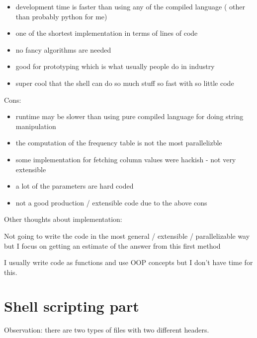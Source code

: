 \documentclass[letterpaper,10pt,english]{/usr/local/lib/python2.7/dist-packages/sphinx/texinputs/sphinxhowto}
\begin{document}
\begin{itemize}
\itemsep1pt\parskip0pt
\item
  development time is faster than using any of the compiled language (
  other than probably python for me)
\item
  one of the shortest implementation in terms of lines of code
\item
  no fancy algorithms are needed
\item
  good for prototyping which is what usually people do in industry
\item
  super cool that the shell can do so much stuff so fast with so little
  code
\end{itemize}

Cons:

\begin{itemize}
\itemsep1pt\parskip0pt
\item
  runtime may be slower than using pure compiled language for doing
  string manipulation
\item
  the computation of the frequency table is not the most parallelizble
\item
  some implementation for fetching column values were hackish - not very
  extensible
\item
  a lot of the parameters are hard coded
\item
  not a good production / extensible code due to the above cons
\end{itemize}

Other thoughts about implementation:

Not going to write the code in the most general / extensible /
parallelizable way but I focus on getting an estimate of the answer from
this first method

I usually write code as functions and use OOP concepts but I don't have
time for this.\section{Shell scripting part}Observation: there are two types of files with two different headers.
\end{document}
